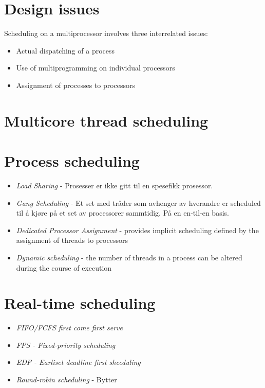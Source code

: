 \section{Design issues}
Scheduling on a multiprocessor involves three interrelated issues:
\begin{itemize}
\item 
Actual dispatching of a process
\item 
Use of multiprogramming on individual processors
\item 
Assignment of processes to processors

\end{itemize}

\section{Multicore thread scheduling}


\section{Process scheduling}
\begin{itemize}
\item 
\emph{Load Sharing} - Prosesser er ikke gitt til en spesefikk prosessor.
\item 
\emph{Gang Scheduling} - Et set med tråder som avhenger av hverandre er scheduled til å kjøre på et set av processorer sammtidig. På en en-til-en basis.
\item 
\emph{Dedicated Processor Assignment} - provides implicit scheduling
defined by the assignment of
threads to processors
\item 
\emph{Dynamic scheduling } - the number of threads in a process
can be altered during the course of
execution
\end{itemize}


\section{Real-time scheduling}
\begin{itemize}
\item 
\emph{FIFO/FCFS first come first serve}
\item 
\emph{FPS - Fixed-priority scheduling} 
\item 
\emph{EDF - Earliset deadline first shceduling}
\item 
\emph{Round-robin scheduling } - Bytter 
\end{itemize}


